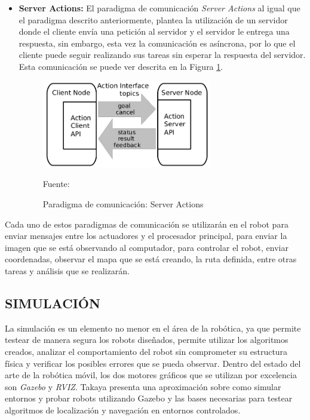 \begin{itemize}
    \item \textbf{Server Actions: }
    El paradigma de comunicación \textit{Server Actions} al igual que el paradigma descrito anteriormente, plantea la utilización de un servidor donde el cliente envía una petición al servidor y el servidor le entrega una respuesta, sin embargo, esta vez la comunicación es asíncrona, por lo que el cliente puede seguir realizando sus tareas sin esperar la respuesta del servidor. Esta comunicación se puede ver descrita en la Figura \ref{fig:ROS_actions}.
    
    \begin{figure}[h]
    \centering
    \includegraphics[width=0.7\textwidth]{figures/02marco_conceptual/ROS_action.png}
    \caption{\label{fig:ROS_actions} Paradigma de comunicación: Server Actions} 
    Fuente: \cite{andres_rosoclingo_2013} 
    \end{figure}
    \end{itemize}
    
    Cada uno de estos paradigmas de comunicación se utilizarán en el robot para enviar mensajes entre los actuadores y el procesador principal, para enviar la imagen que se está observando al computador, para controlar el robot, enviar coordenadas, observar el mapa que se está creando, la ruta definida, entre otras tareas y análisis que se realizarán.

\newpage
\subsection{SIMULACIÓN}
La simulación es un elemento no menor en el área de la robótica, ya que permite testear de manera segura los robots diseñados, permite utilizar los algoritmos creados, analizar el comportamiento del robot sin comprometer su estructura física y verificar los posibles errores que se pueda observar. Dentro del estado del arte de la robótica móvil, los dos motores gráficos que se utilizan por excelencia son \textit{Gazebo} y \textit{RVIZ}. Takaya presenta una aproximación sobre como simular entornos y probar robots utilizando Gazebo \cite{takaya_simulation_2016} y las bases necesarias para testear algoritmos de localización y navegación en entornos controlados.

